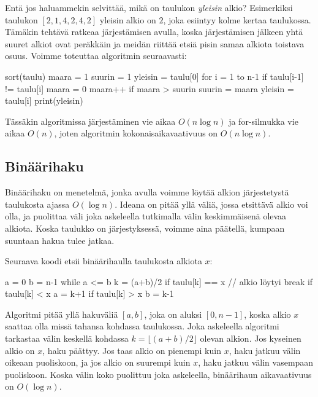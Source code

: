 Entä jos haluammekin selvittää, mikä on taulukon \emph{yleisin} alkio?
Esimerkiksi taulukon $[2,1,4,2,4,2]$ yleisin alkio on $2$,
joka esiintyy kolme kertaa taulukossa.
Tämäkin tehtävä ratkeaa järjestämisen avulla, koska
järjestämisen jälkeen yhtä suuret alkiot ovat peräkkäin ja
meidän riittää etsiä pisin samaa alkiota toistava osuus.
Voimme toteuttaa algoritmin seuraavasti:

\begin{code}
sort(taulu)
maara = 1
suurin = 1
yleisin = taulu[0]
for i = 1 to n-1
    if taulu[i-1] != taulu[i]
        maara = 0
    maara++
    if maara > suurin
        suurin = maara
        yleisin = taulu[i]
print(yleisin)
\end{code}

Tässäkin algoritmissa järjestäminen vie aikaa $O(n \log n)$ ja
for-silmukka vie aikaa $O(n)$, joten algoritmin
kokonaisaikavaativuus on $O(n \log n)$.

\subsection{Binäärihaku}

Binäärihaku on menetelmä, jonka avulla voimme löytää alkion
järjestetystä taulukosta ajassa $O(\log n)$.
Ideana on pitää yllä väliä, jossa etsittävä alkio voi olla,
ja puolittaa väli joka askeleella tutkimalla välin
keskimmäisenä olevaa alkiota.
Koska taulukko on järjestyksessä, voimme aina päätellä,
kumpaan suuntaan hakua tulee jatkaa.

Seuraava koodi etsii binäärihaulla taulukosta alkiota $x$:

\begin{code}
a = 0
b = n-1
while a <= b
    k = (a+b)/2
    if taulu[k] == x
        // alkio löytyi
        break
    if taulu[k] < x
        a = k+1
    if taulu[k] > x
        b = k-1
\end{code}

Algoritmi pitää yllä hakuväliä $[a,b]$, joka on aluksi $[0,n-1]$,
koska alkio $x$ saattaa olla missä tahansa kohdassa taulukossa.
Joka askeleella algoritmi tarkastaa välin keskellä kohdassa
$k=\lfloor (a+b)/2 \rfloor$ olevan alkion.
Jos kyseinen alkio on $x$, haku päättyy.
Jos taas alkio on pienempi kuin $x$, haku jatkuu välin
oikeaan puoliskoon,
ja jos alkio on suurempi kuin $x$, haku jatkuu välin
vasempaan puoliskoon.
Koska välin koko puolittuu joka askeleella,
binäärihaun aikavaativuus on $O(\log n)$.

